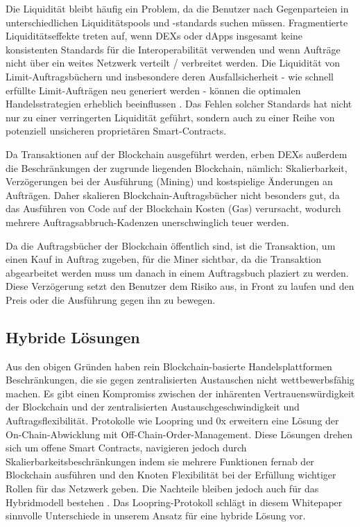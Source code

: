 \documentclass[UTF8,nofonts]{article}
\begin{document}
\begin{multicols}{2}
Die Liquidität bleibt häufig ein Problem, da die Benutzer nach Gegenparteien in unterschiedlichen Liquiditätspools und -standards suchen müssen. Fragmentierte Liquiditätseffekte treten auf, wenn DEXs oder dApps insgesamt keine konsistenten Standards für die Interoperabilität verwenden und wenn Aufträge nicht über ein weites Netzwerk verteilt / verbreitet werden. Die Liquidität von Limit-Auftragsbüchern und insbesondere deren Ausfallsicherheit - wie schnell erfüllte Limit-Aufträgen neu generiert werden - können die optimalen Handelsstrategien erheblich beeinflussen \cite{limitorderliquidity}. Das Fehlen solcher Standards hat nicht nur zu einer verringerten Liquidität geführt, sondern auch zu einer Reihe von potenziell unsicheren proprietären Smart-Contracts. 

Da Transaktionen auf der Blockchain ausgeführt werden, erben DEXs außerdem die Beschränkungen der zugrunde liegenden Blockchain, nämlich: Skalierbarkeit, Verzögerungen bei der Ausführung (Mining) und kostspielige Änderungen an Aufträgen. Daher skalieren Blockchain-Auftragsbücher nicht besonders gut, da das Ausführen von Code auf der Blockchain Kosten (Gas) verursacht, wodurch mehrere Auftragsabbruch-Kadenzen unerschwinglich teuer werden.

Da die Auftragsbücher der Blockchain öffentlich sind, ist die Transaktion, um einen Kauf in Auftrag zugeben, für die Miner sichtbar, da die Transaktion abgearbeitet werden muss um danach in einem Auftragsbuch plaziert zu werden. Diese Verzögerung setzt den Benutzer dem Risiko aus, in Front zu laufen und den Preis oder die Ausführung gegen ihn zu bewegen.

\subsection{Hybride Lösungen}
Aus den obigen Gründen haben rein Blockchain-basierte Handelsplattformen Beschränkungen, die sie gegen zentralisierten Austauschen nicht wettbewerbsfähig machen. Es gibt einen Kompromiss zwischen der inhärenten Vertrauenswürdigkeit der Blockchain und der zentralisierten Austauschgeschwindigkeit und Auftragsflexibilität. Protokolle wie Loopring und 0x \cite{warren20170x} erweitern eine Lösung der On-Chain-Abwicklung mit Off-Chain-Order-Management. Diese Lösungen drehen sich um offene Smart Contracts, navigieren jedoch durch Skalierbarkeitsbeschränkungen indem sie mehrere Funktionen fernab der Blockchain ausführen und den Knoten Flexibilität bei der Erfüllung wichtiger Rollen für das Netzwerk geben. Die Nachteile bleiben jedoch auch für das Hybridmodell bestehen \cite{costofdecent}. Das Loopring-Protokoll schlägt in diesem Whitepaper sinnvolle Unterschiede in unserem Ansatz für eine hybride Lösung vor.


\end{multicols}
\end{document}

